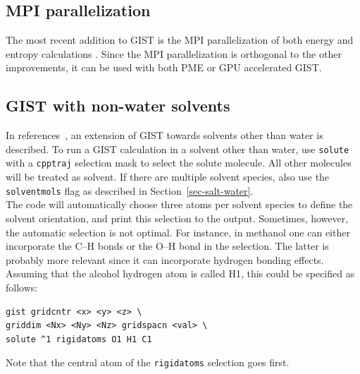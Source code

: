 \documentclass[9pt,tutorial]{livecoms}
\newcommand{\software}{\texttt}
\newcommand\inlinecode{\texttt}
\begin{document}
\subsection{MPI parallelization}
The most recent addition to GIST is the MPI parallelization of both energy and entropy calculations \cite{Roe2023-mpi-gist}.
Since the MPI parallelization is orthogonal to the other improvements, it can be used with both PME or GPU accelerated GIST.
\subsection{GIST with non-water solvents}
In references~\cite{Kraml2020,Kamenik2020-gist-macrocycles,Waibl2022-gist-solvents}, an extension of GIST towards solvents other than water is described.
To run a GIST calculation in a solvent other than water, use \inlinecode{solute} with a \software{cpptraj} selection mask to select the solute molecule.
All other molecules will be treated as solvent.
If there are multiple solvent species, also use the \inlinecode{solventmols} flag as described in Section~\ref{sec-salt-water}. \\
The code will automatically choose three atoms per solvent species to define the solvent orientation, and print this selection to the output.
Sometimes, however, the automatic selection is not optimal.
For instance, in methanol one can either incorporate the C--H bonds or the O--H bond in the selection.
The latter is probably more relevant since it can incorporate hydrogen bonding effects.
Assuming that the alcohol hydrogen atom is called H1, this could be specified as follows:

\begin{lstlisting}[style=cpptraj]
gist gridcntr <x> <y> <z> \
griddim <Nx> <Ny> <Nz> gridspacn <val> \
solute ^1 rigidatoms O1 H1 C1
\end{lstlisting}
Note that the central atom of the \inlinecode{rigidatoms} selection goes first.
\end{document}
